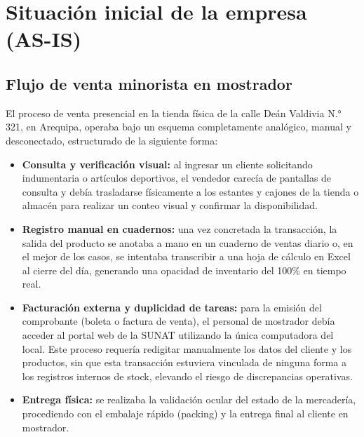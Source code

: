 \section{Situación inicial de la empresa (AS-IS)}

\subsection{Flujo de venta minorista en mostrador}
\begin{indentedsubsection}
El proceso de venta presencial en la tienda física de la calle Deán Valdivia N.° 321, en Arequipa, operaba bajo un esquema completamente analógico, manual y desconectado, estructurado de la siguiente forma:

\begin{itemize}
    \item \textbf{Consulta y verificación visual:} al ingresar un cliente solicitando indumentaria o artículos deportivos, el vendedor carecía de pantallas de consulta y debía trasladarse físicamente a los estantes y cajones de la tienda o almacén para realizar un conteo visual y confirmar la disponibilidad.
    \item \textbf{Registro manual en cuadernos:} una vez concretada la transacción, la salida del producto se anotaba a mano en un cuaderno de ventas diario o, en el mejor de los casos, se intentaba transcribir a una hoja de cálculo en Excel al cierre del día, generando una opacidad de inventario del 100\% en tiempo real.
    \item \textbf{Facturación externa y duplicidad de tareas:} para la emisión del comprobante (boleta o factura de venta), el personal de mostrador debía acceder al portal web de la SUNAT utilizando la única computadora del local. Este proceso requería redigitar manualmente los datos del cliente y los productos, sin que esta transacción estuviera vinculada de ninguna forma a los registros internos de stock, elevando el riesgo de discrepancias operativas.
    \item \textbf{Entrega física:} se realizaba la validación ocular del estado de la mercadería, procediendo con el embalaje rápido (packing) y la entrega final al cliente en mostrador.
\end{itemize}
\end{indentedsubsection}

